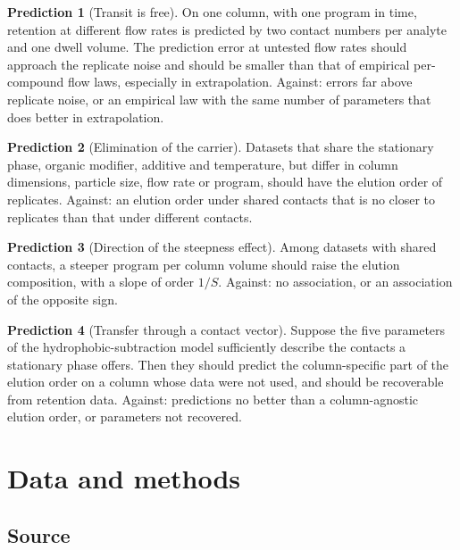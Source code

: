 \documentclass[11pt,a4paper]{article}
\theoremstyle{definition}
\newtheorem{prediction}{Prediction}
\theoremstyle{remark}
\begin{document}
\begin{prediction}[Transit is free]
\label{pr:flow}
On one column, with one program in time, retention at different flow rates is predicted by two contact numbers per analyte and one dwell volume.
The prediction error at untested flow rates should approach the replicate noise and should be smaller than that of empirical per-compound flow laws, especially in extrapolation.
Against: errors far above replicate noise, or an empirical law with the same number of parameters that does better in extrapolation.
\end{prediction}

\begin{prediction}[Elimination of the carrier]
\label{pr:carrier}
Datasets that share the stationary phase, organic modifier, additive and temperature, but differ in column dimensions, particle size, flow rate or program, should have the elution order of replicates.
Against: an elution order under shared contacts that is no closer to replicates than that under different contacts.
\end{prediction}

\begin{prediction}[Direction of the steepness effect]
\label{pr:steepness}
Among datasets with shared contacts, a steeper program per column volume should raise the elution composition, with a slope of order $1/S$.
Against: no association, or an association of the opposite sign.
\end{prediction}

\begin{prediction}[Transfer through a contact vector]
\label{pr:hsm}
Suppose the five parameters of the hydrophobic-subtraction model \citep{snyder2004} sufficiently describe the contacts a stationary phase offers.
Then they should predict the column-specific part of the elution order on a column whose data were not used, and should be recoverable from retention data.
Against: predictions no better than a column-agnostic elution order, or parameters not recovered.
\end{prediction}

\section{Data and methods}
\label{sec:data}

\subsection{Source}
\end{document}

